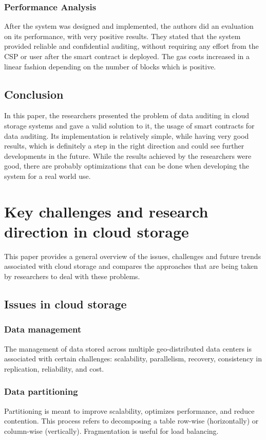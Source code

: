 \documentclass[14pt,oneside]{extreport}
\newcommand*\fpar{\hspace{1ex}}
\begin{document}
\subsection{Performance Analysis}
After the system was designed and implemented, the authors did an evaluation on its performance, with very positive results. They stated that the system provided reliable and confidential auditing, without requiring any effort from the CSP or user after the smart contract is deployed. The gas costs increased in a linear fashion depending on the number of blocks which is positive.
\section{Conclusion}
In this paper, the researchers presented the problem of data auditing in cloud storage systems and gave a valid solution to it, the usage of smart contracts for data auditing. Its implementation is relatively simple, while having very good results, which is definitely a step in the right direction and could see further developments in the future. While the results achieved by the researchers were good, there are probably optimizations that can be done when developing the system for a real world use.

\chapter{Key challenges and research direction in cloud storage \cite{paper5}}
\fpar This paper provides a general overview of the issues, challenges and future trends associated with cloud storage and compares the approaches that are being taken by researchers to deal with these problems.
\section{Issues in cloud storage}
\subsection{Data management}
\fpar The management of data stored across multiple geo-distributed data centers is associated with certain challenges: scalability, parallelism, recovery, consistency in replication, reliability, and cost.
\subsection{Data partitioning}
\fpar Partitioning is meant to improve scalability, optimizes performance, and reduce contention. This process refers to decomposing a table row-wise (horizontally) or column-wise (vertically). Fragmentation is useful for load balancing.
\end{document}
